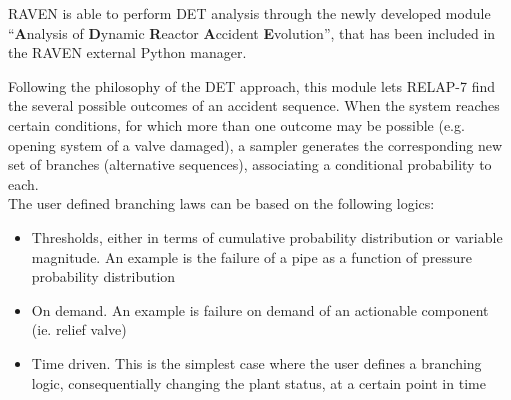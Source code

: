 \label{sec:DETRavenApproach}
RAVEN is able to perform DET analysis through the newly developed module ``\textbf{A}nalysis of \textbf{D}ynamic \textbf{R}eactor \textbf{A}ccident \textbf{E}volution'', that has been included in the RAVEN external Python manager. 

Following the philosophy of the DET approach, this module lets RELAP-7 find the several possible outcomes of an accident sequence. When the system reaches certain conditions, for which more than one outcome may be possible (e.g. opening system of a valve damaged), a sampler generates the corresponding new set of branches (alternative sequences), associating a conditional probability to each.
\\The user defined branching laws can be based on the following logics:
\vspace{-5mm}
\begin{itemize}
\itemsep0em
\item Thresholds, either in terms of cumulative probability distribution or variable magnitude. An example is the failure of a pipe as a function of pressure probability distribution
\item On demand. An example is failure on demand of an actionable component (ie. relief valve)
\item Time driven. This is the simplest case where the user defines a branching logic, consequentially changing  the plant status, at a certain point in time
\end{itemize}
\vspace{-5mm}


